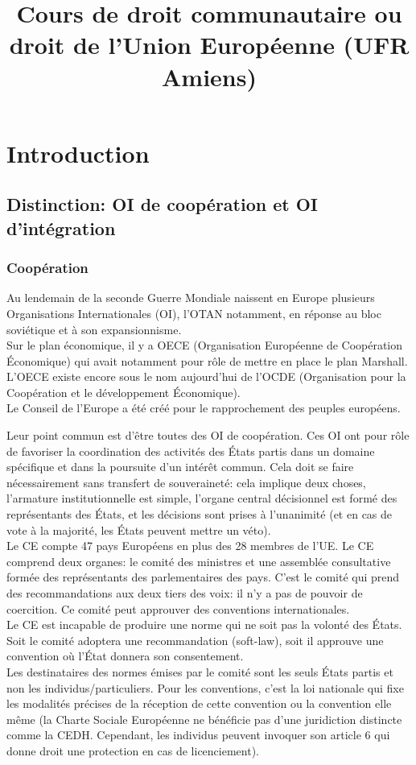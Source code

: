 \documentclass[12pt, a4paper, openany]{book}
\date{}
\title{Cours de droit communautaire ou droit de l'Union Européenne (UFR Amiens)}
\begin{document}

\chapter{Introduction}

\section{Distinction: OI de coopération et OI d'intégration}

\subsection{Coopération}

Au lendemain de la seconde Guerre Mondiale naissent en Europe plusieurs Organisations Internationales (OI), l'OTAN notamment, en réponse au bloc soviétique et à son expansionnisme. \\ 
Sur le plan économique, il y a OECE (Organisation Européenne de Coopération Économique) qui avait notamment pour rôle de mettre en place le plan Marshall. L'OECE existe encore sous le nom aujourd'hui de l'OCDE (Organisation pour la Coopération et le développement Économique). \\
Le Conseil de l'Europe a été créé pour le rapprochement des peuples européens.


Leur point commun est d'être toutes des OI de coopération. Ces OI ont pour rôle de favoriser la coordination des activités des États partis dans un domaine spécifique et dans la poursuite d'un intérêt commun. Cela doit se faire nécessairement sans transfert de souveraineté: cela implique deux choses, l'armature institutionnelle est simple, l'organe central décisionnel est formé des représentants des États, et les décisions sont prises à l'unanimité (et en cas de vote à la majorité, les États peuvent mettre un véto). \\
Le CE compte 47 pays Européens en plus des 28 membres de l'UE. Le CE comprend deux organes: le comité des ministres et une assemblée consultative formée des représentants des parlementaires des pays. C'est le comité qui prend des recommandations aux deux tiers des voix: il n'y a pas de pouvoir de coercition. Ce comité peut approuver des conventions internationales.  \\
Le CE est incapable de produire une norme qui ne soit pas la volonté des États. Soit le comité adoptera une recommandation (soft-law), soit il approuve une convention où l'État donnera son consentement. \\
Les destinataires des normes émises par le comité sont les seuls États partis et non les individus/particuliers. Pour les conventions, c'est la loi nationale qui fixe les modalités précises de la réception de cette convention ou la convention elle même (la Charte Sociale Européenne ne bénéficie pas d'une juridiction distincte comme la CEDH. Cependant, les individus peuvent invoquer son article 6 qui donne droit une protection en cas de licenciement). 
\end{document}
